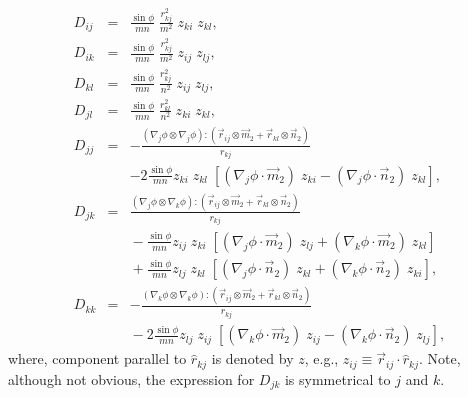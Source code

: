 \documentclass{article}
\begin{document}
\begin{eqnarray}
D_{ij} 
&=& \frac {\sin \phi} {mn} \; \frac {r_{kj}^2} {m^2} \;
  z_{ki} \; z_{kl}, \\
%
D_{ik} 
&=&  \frac {\sin \phi} {mn} \; \frac {r_{kj}^2} {m^2} \; 
  z_{ij} \; z_{lj}, \\
%
D_{kl}
&=& \frac {\sin \phi} {mn} \; \frac {r_{kj}^2}{n^2} \; 
  z_{ij} \; z_{lj} , \\
%
D_{jl}
&=& \frac {\sin \phi} {mn} \; \frac {r_{kl}^2} {n^2} \;
  z_{ki} \; z_{kl} , \\
%
D_{jj} 
&=& - \frac{
    (\nabla_j \phi \otimes \nabla_j \phi)  : 
    (\vec r_{ij} \otimes \vec m_2 + \vec r_{kl} \otimes \vec n_2)
  } {r_{kj}} \nonumber \\
& & - 2 \frac {\sin \phi} {mn}  
  z_{ki} \; z_{kl} \;
  [
    (\nabla_j \phi \cdot \vec m_2) \; z_{ki}
   -(\nabla_j \phi \cdot \vec n_2) \; z_{kl}
  ], \\
%
D_{jk} 
&=&
\frac{ 
    (\nabla_j \phi \otimes \nabla_k \phi)  : 
    (\vec r_{ij} \otimes \vec m_2 + \vec r_{kl} \otimes \vec n_2)
} {r_{kj}} \nonumber \\
& & 
{} -\frac {\sin \phi} {mn}
  z_{ij} \; z_{ki} \;
  [
    (\nabla_j \phi \cdot \vec m_2) \; z_{lj}
   +(\nabla_k \phi \cdot \vec m_2) \; z_{kl}
  ] \nonumber \\
& &
 {} +\frac {\sin \phi} {mn}
  z_{lj} \; z_{kl} \;
  [
    (\nabla_j \phi \cdot \vec n_2) \; z_{kl}
   +(\nabla_k \phi \cdot \vec n_2) \; z_{ki}
  ], \\
%
D_{kk}
&=& - \frac{
    (\nabla_k \phi \otimes \nabla_k \phi)  : 
    (\vec r_{ij} \otimes \vec m_2 + \vec r_{kl} \otimes \vec n_2)
  } {r_{kj}} \nonumber \\
& & {}- 2 \frac {\sin \phi} {mn}  
  z_{lj} \; z_{ij} \;
  [
    (\nabla_k \phi \cdot \vec m_2) \; z_{ij}
   -(\nabla_k \phi \cdot \vec n_2) \; z_{lj}
  ],
\end{eqnarray}
where, component parallel to $\hat r_{kj}$ is denoted by $z$, e.g., 
$z_{ij} \equiv \vec r_{ij} \cdot \hat r_{kj}$.
Note, although not obvious, the expression for $D_{jk}$ is symmetrical to $j$ and $k$. 
\end{document}
